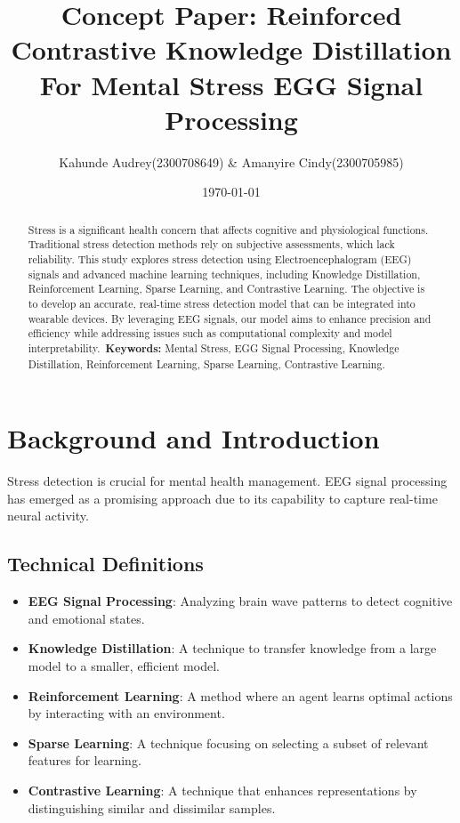 \documentclass[a4paper,10pt]{article}
\title{Concept Paper: Reinforced Contrastive Knowledge Distillation For Mental Stress EGG Signal Processing}
\author{Kahunde Audrey(2300708649) & Amanyire Cindy(2300705985)}
\date{\today}
\begin{document}
\maketitle

\begin{abstract}
Stress is a significant health concern that affects cognitive and physiological functions. Traditional stress detection methods rely on subjective assessments, which lack reliability. This study explores stress detection using Electroencephalogram (EEG) signals and advanced machine learning techniques, including Knowledge Distillation, Reinforcement Learning, Sparse Learning, and Contrastive Learning. The objective is to develop an accurate, real-time stress detection model that can be integrated into wearable devices. By leveraging EEG signals, our model aims to enhance precision and efficiency while addressing issues such as computational complexity and model interpretability.\
\textbf{Keywords:} Mental Stress, EGG Signal Processing, Knowledge Distillation, Reinforcement Learning, Sparse Learning, Contrastive Learning.
\end{abstract}

\section{Background and Introduction}
Stress detection is crucial for mental health management. EEG signal processing has emerged as a promising approach due to its capability to capture real-time neural activity. 

\subsection{Technical Definitions}
\begin{itemize}
    \item \textbf{EEG Signal Processing}: Analyzing brain wave patterns to detect cognitive and emotional states.
    \item \textbf{Knowledge Distillation}: A technique to transfer knowledge from a large model to a smaller, efficient model.
    \item \textbf{Reinforcement Learning}: A method where an agent learns optimal actions by interacting with an environment.
    \item \textbf{Sparse Learning}: A technique focusing on selecting a subset of relevant features for learning.
    \item \textbf{Contrastive Learning}: A technique that enhances representations by distinguishing similar and dissimilar samples.
\end{itemize}
\end{document}
